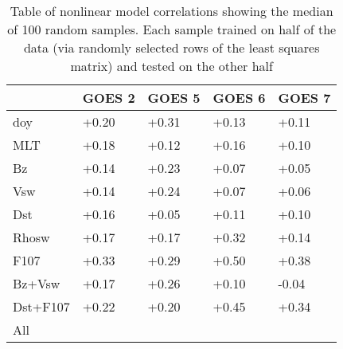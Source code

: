 \begin{table}[h]
\small
\begin{tabular}{|l|llll|}
\hline
 & GOES 2 & GOES 5 & GOES 6 & GOES 7\\ \hline
doy & +0.20 & +0.31 & +0.13 & +0.11 \\
MLT & +0.18 & +0.12 & +0.16 & +0.10 \\
Bz & +0.14 & +0.23 & +0.07 & +0.05 \\
Vsw & +0.14 & +0.24 & +0.07 & +0.06 \\
Dst & +0.16 & +0.05 & +0.11 & +0.10 \\
Rhosw & +0.17 & +0.17 & +0.32 & +0.14 \\
F107 & +0.33 & +0.29 & +0.50 & +0.38 \\
Bz+Vsw & +0.17 & +0.26 & +0.10 & -0.04 \\
Dst+F107 & +0.22 & +0.20 & +0.45 & +0.34 \\
All &  &  &  &  \\
\hline
\end{tabular}
\caption{Table of nonlinear model correlations showing the median of 100 random samples. Each sample trained on half of the data (via randomly selected rows of the least squares matrix) and tested on the other half} 
\label{perltable}
\end{table}
